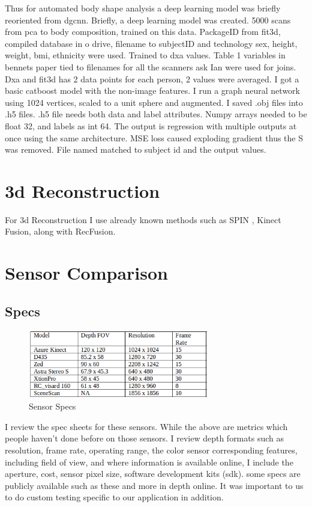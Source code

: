 Thus for automated body shape analysis a deep learning model was briefly reoriented from dgcnn. Briefly, a deep learning model was created. 5000 scans from pca to body composition, trained on this data. PackageID from fit3d, compiled database in o drive, filename to subjectID and technology sex, height, weight, bmi, ethnicity were used. Trained to dxa values. Table 1 variables in bennets paper tied to filenames for all the scanners ask Ian were used for joins. Dxa and fit3d has 2 data points for each person, 2 values were averaged. I got a basic catboost model with the non-image features. I run a graph neural network using 1024 vertices, scaled to a unit sphere and augmented. I saved .obj files into .h5 files. .h5 file needs both data and label attributes. Numpy arrays needed to be float 32, and labels as int 64. The output is regression with multiple outputs at once using the same architecture. MSE loss caused exploding gradient thus the S was removed. File named matched to subject id and the output values. 

\section{3d Reconstruction}
For 3d Reconstruction I use already known methods such as SPIN \cite{kolotouros2019learning} , Kinect Fusion, along with RecFusion.
\section{Sensor Comparison}

\subsection{Specs}
\begin{figure}[h]
	\caption{Sensor Specs}
	\centering
	\includegraphics[width=0.7\textwidth, angle=0]{images/sensor_specs.png}
\end{figure}
I review the spec sheets for these sensors. While the above are metrics which people haven't done before on those sensors. I review depth formats such as resolution, frame rate, operating range, the color sensor corresponding features, including field of view, and where information is available online, I include the aperture, cost, sensor pixel size, software development kits (sdk).
some specs are publicly available such as these and more in depth online. It was important to us to do custom testing specific to our application in addition.

